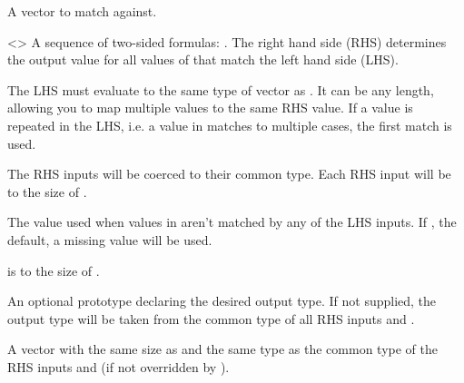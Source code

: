 \documentclass[a4paper]{book}
\begin{document}
\begin{Arguments}
\begin{ldescription}
\item[\code{.x}] A vector to match against.

\item[\code{...}] <> A sequence of two-sided
formulas: . The right hand side (RHS) determines
the output value for all values of  that match the left hand side
(LHS).

The LHS must evaluate to the same type of vector as . It can be any
length, allowing you to map multiple  values to the same RHS value.
If a value is repeated in the LHS, i.e. a value in  matches to
multiple cases, the first match is used.

The RHS inputs will be coerced to their common type. Each RHS input will be
 to the size of .

\item[\code{.default}] The value used when values in  aren't matched by any of
the LHS inputs. If , the default, a missing value will be used.

 is  to the size of
.

\item[\code{.ptype}] An optional prototype declaring the desired output type. If
not supplied, the output type will be taken from the common type of
all RHS inputs and .
\end{ldescription}
\end{Arguments}
%
\begin{Value}
A vector with the same size as  and the same type as the common type of
the RHS inputs and  (if not overridden by ).
\end{Value}
%
\begin{SeeAlso}
\end{SeeAlso}
%
\end{document}
